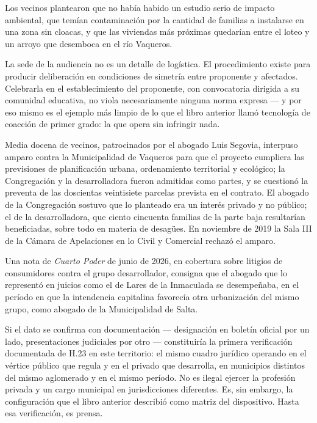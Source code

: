 Los vecinos plantearon que no había habido un estudio serio de impacto ambiental, que temían contaminación por la cantidad de familias a instalarse en una zona sin cloacas, y que las viviendas más próximas quedarían entre el loteo y un arroyo que desemboca en el río Vaqueros.

La sede de la audiencia no es un detalle de logística. El procedimiento existe para producir deliberación en condiciones de simetría entre proponente y afectados. Celebrarla en el establecimiento del proponente, con convocatoria dirigida a su comunidad educativa, no viola necesariamente ninguna norma expresa --- y por eso mismo es el ejemplo más limpio de lo que el libro anterior llamó tecnología de coacción de primer grado: la que opera sin infringir nada.

Media docena de vecinos, patrocinados por el abogado Luis Segovia, interpuso amparo contra la Municipalidad de Vaqueros para que el proyecto cumpliera las previsiones de planificación urbana, ordenamiento territorial y ecológico; la Congregación y la desarrolladora fueron admitidas como partes, y se cuestionó la preventa de las doscientas veintisiete parcelas prevista en el contrato. El abogado de la Congregación sostuvo que lo planteado era un interés privado y no público; el de la desarrolladora, que ciento cincuenta familias de la parte baja resultarían beneficiadas, sobre todo en materia de desagües. En noviembre de 2019 la Sala III de la Cámara de Apelaciones en lo Civil y Comercial rechazó el amparo.

Una nota de \textit{Cuarto Poder} de junio de 2026, en cobertura sobre litigios de consumidores contra el grupo desarrollador, consigna que el abogado que lo representó en juicios como el de Lares de la Inmaculada se desempeñaba, en el período en que la intendencia capitalina favorecía otra urbanización del mismo grupo, como abogado de la Municipalidad de Salta.

Si el dato se confirma con documentación --- designación en boletín oficial por un lado, presentaciones judiciales por otro --- constituiría la primera verificación documentada de H.23 en este territorio: el mismo cuadro jurídico operando en el vértice público que regula y en el privado que desarrolla, en municipios distintos del mismo aglomerado y en el mismo período. No es ilegal ejercer la profesión privada y un cargo municipal en jurisdicciones diferentes. Es, sin embargo, la configuración que el libro anterior describió como matriz del dispositivo. Hasta esa verificación, es prensa.


